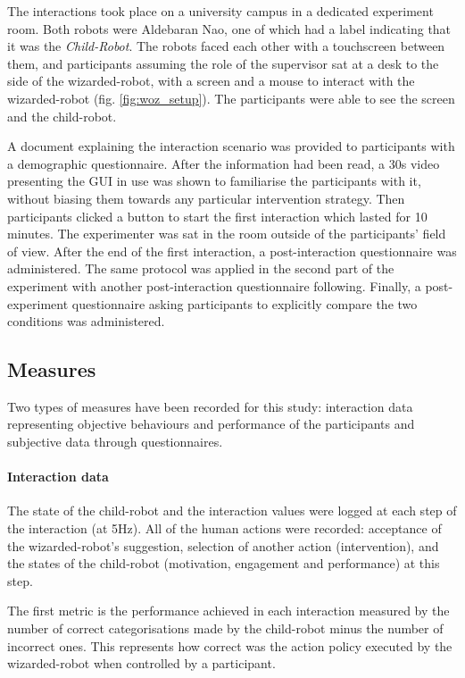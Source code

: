 The interactions took place on a university campus in a dedicated experiment room. Both robots were Aldebaran Nao, one of which had a label indicating that it was the \emph{Child-Robot}. The robots faced each other with a touchscreen between them, and participants assuming the role of the supervisor sat at a desk to the side of the wizarded-robot, with a screen and a mouse to interact with the wizarded-robot (fig. \ref{fig:woz_setup}). The participants were able to see the screen and the child-robot.

A document explaining the interaction scenario was provided to participants with a demographic questionnaire. After the information had been read, a 30s video presenting the GUI in use was shown to familiarise the participants with it, without biasing them towards any particular intervention strategy. Then participants clicked a button to start the first interaction which lasted for 10 minutes. The experimenter was sat in the room outside of the participants' field of view. After the end of the first interaction, a post-interaction questionnaire was administered. The same protocol was applied in the second part of the experiment with another post-interaction questionnaire following. Finally, a post-experiment questionnaire asking participants to explicitly compare the two conditions was administered.

\subsection{Measures}

Two types of measures have been recorded for this study: interaction data representing objective behaviours and performance of the participants and subjective data through questionnaires.

\paragraph{Interaction data}

The state of the child-robot and the interaction values were logged at each step of the interaction (at 5Hz). All of the human actions were recorded: acceptance of the wizarded-robot's suggestion, selection of another action (intervention), and the states of the child-robot (motivation, engagement and performance) at this step. 

The first metric is the performance achieved in each interaction measured by the number of correct categorisations made by the child-robot minus the number of incorrect ones. This represents how correct was the action policy executed by the wizarded-robot when controlled by a participant.

